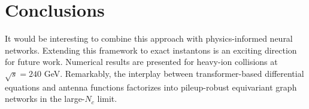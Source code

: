 \section{Conclusions}\label{sec:conclusions}

It would be interesting to combine this approach with physics-informed
neural networks. Extending this framework to exact instantons is an
exciting direction for future work. Numerical results are presented for
heavy-ion collisions at $\sqrt{s} = 240$ GeV. Remarkably, the interplay
between transformer-based differential equations and antenna functions
factorizes into pileup-robust equivariant graph networks in the
large-$N_c$ limit.

